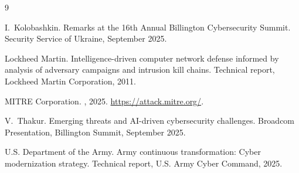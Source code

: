 \documentclass[sigconf,nonacm]{acmart}
\begin{document}

\begin{thebibliography}{9}

I.~Kolobashkin.
\newblock Remarks at the {16th Annual Billington Cybersecurity Summit}.
\newblock Security Service of Ukraine, September 2025.

Lockheed Martin.
\newblock Intelligence-driven computer network defense informed by analysis of
  adversary campaigns and intrusion kill chains.
\newblock Technical report, Lockheed Martin Corporation, 2011.

{MITRE Corporation}.
, 2025.
\newblock \url{https://attack.mitre.org/}.

V.~Thakur.
\newblock Emerging threats and {AI}-driven cybersecurity challenges.
\newblock Broadcom Presentation, Billington Summit, September 2025.

{U.S. Department of the Army}.
\newblock Army continuous transformation: Cyber modernization strategy.
\newblock Technical report, U.S. Army Cyber Command, 2025.

\end{thebibliography}
\end{document}
